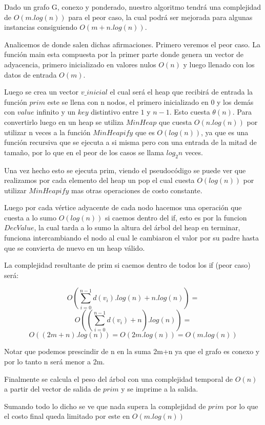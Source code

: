 Dado un grafo G, conexo y ponderado, nuestro algoritmo tendrá una complejidad de $O(m.log(n))$ para el peor caso, la cual podrá ser mejorada para algunas instancias consiguiendo $O(m + n.log(n))$.

Analicemos de donde salen dichas afirmaciones. Primero veremos el peor caso. La función main esta compuesta por la primer parte donde  genera un vector de adyacencia, primero inicializado en valores nulos $O(n)$ y luego llenado con los datos de entrada $O(m)$.

Luego se crea un vector $v\_inicial$ el cual será el heap que recibirá de entrada la función $prim$ este se llena con n nodos, el primero inicializado en $0$ y los demás con $value$ infinito y un $key$ distintivo entre $1$ y $n-1$. Esto cuesta $\theta(n)$. Para convertirlo luego en un heap se utiliza $MinHeap$ que cuesta $O(n.log(n))$ por utilizar n veces a la función $MinHeapify$ que es $O(log(n))$, ya que es una función recursiva que se ejecuta a si misma pero con una entrada de la mitad de tamaño, por lo que en el peor de los casos se llama $log_2 n$ veces.

Una vez hecho esto se ejecuta prim, viendo el pseudocódigo se puede ver que realizamos por cada elemento del heap un pop el cual cuesta $O(log(n))$ por utilizar $MinHeapify$ mas otras operaciones de costo constante.

Luego por cada vértice adyacente de cada nodo hacemos una operación que cuesta a lo sumo $O(log(n))$ si caemos dentro del if, esto es por la funcion $DecValue$, la cual tarda a lo sumo la altura del árbol del heap en terminar, funciona intercambiando el nodo al cual le cambiaron el valor por su padre hasta que se convierta de nuevo en un heap válido.

La complejidad resultante de prim si caemos dentro de todos los if (peor caso) será:

	$$O( \sum_{i=0}^{n-1}d(v_{i}).log(n) + n.log(n) ) = $$
	$$O( (\sum_{i=0}^{n-1}d(v_{i}) + n).log(n) ) = $$
	$$O( (2m + n).log(n) ) = O( 2m.log(n) ) = O(m.log(n))$$ 

Notar que podemos prescindir de n en la suma 2m+n ya que el grafo es conexo y por lo tanto n será menor a 2m.

Finalmente se calcula el peso del árbol con una complejidad temporal de $O(n)$ a partir del vector de salida de $prim$ y se imprime a la salida.

Sumando todo lo dicho se ve que nada supera la complejidad de $prim$ por lo que el costo final queda limitado por este en $O(m.log(n))$

